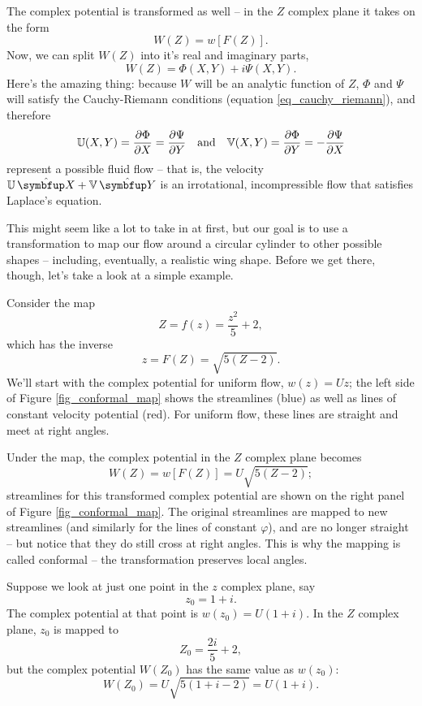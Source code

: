 The complex potential is transformed as well -- in the $Z$ complex plane it takes on the form
\begin{equation}
W(Z) = w[F(Z)].
\end{equation}
Now, we can split $W(Z)$ into it's real and imaginary parts,
\begin{equation}
W(Z) = \Phi(X, Y) + i\Psi(X, Y).
\end{equation}
Here's the amazing thing:  because $W$ will be an analytic function of $Z$, $\Phi$ and $\Psi$ will satisfy the Cauchy-Riemann conditions (equation \ref{eq_cauchy_riemann}), and therefore
\begin{equation}
\mathbb{U}(X, Y) = \frac{\partial {\Phi}}{\partial {X}} = \frac{\partial {\Psi}}{\partial {Y}} \quad \text{and} \quad \mathbb{V}(X, Y) = \frac{\partial {\Phi}}{\partial {Y}} = -\frac{\partial {\Psi}}{\partial {X}}
\end{equation}
represent a possible fluid flow -- that is, the velocity  $\U \, \unit{X} +  \V \, \unit{Y}$ is an irrotational, incompressible flow that satisfies Laplace's equation.

This might seem like a lot to take in at first, but our goal is to use a transformation to map our flow around a circular cylinder to other possible shapes -- including, eventually, a realistic wing shape.  Before we get there, though, let's take a look at a simple example.



\begin{example}
\label{ex_conformal_map}
Consider the map
\[
Z = f(z) = \frac{z^2}{5} + 2,
\]
which has the inverse 
\[
z = F(Z) = \sqrt{5(Z-2)}.
\]
We'll start with the complex potential for uniform flow, $w(z) = Uz$; the left side of Figure \ref{fig_conformal_map} shows the streamlines (blue) as well as lines of constant velocity potential (red).  For uniform flow, these lines are straight and meet at right angles.

Under the map, the complex potential in the $Z$ complex plane becomes
\[
W(Z) = w[F(Z)] = U\sqrt{5(Z-2)};
\]
streamlines for this transformed complex potential are shown on the right panel of Figure \ref{fig_conformal_map}.  The original streamlines are mapped to new streamlines (and similarly for the lines of constant $\varphi$), and are no longer straight -- but notice that they do still cross at right angles.  This is why the mapping is called conformal -- the transformation preserves local angles.

Suppose we look at just one point in the $z$ complex plane, say
\[
z_0 = 1 + i.
\]
The complex potential at that point is $w(z_0) = U(1+i)$.  In the $Z$ complex plane, $z_0$ is mapped to
\[
Z_0 = \frac{2i}{5} + 2,
\]
but the complex potential $W(Z_0)$ has the same value as $w(z_0)$:
\[
W(Z_0) = U\sqrt{5(1+i - 2)} = U(1+i).
\]

\end{example}

